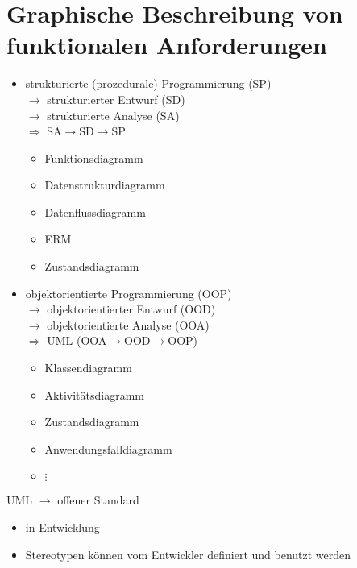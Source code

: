 \documentclass{scrreprt}
\begin{document}
\section{Graphische Beschreibung von funktionalen Anforderungen}
\begin{itemize}
\item strukturierte (prozedurale) Programmierung (SP)\\
$\to$ strukturierter Entwurf (SD)\\
$\to$ strukturierte Analyse (SA)\\
$\Rightarrow$ SA$\to$SD$\to$SP
\begin{itemize}
\item Funktionsdiagramm
\item Datenstrukturdiagramm
\item Datenflussdiagramm
\item ERM
\item Zustandsdiagramm
\end{itemize}
\item objektorientierte Programmierung (OOP)\\
$\to$ objektorientierter Entwurf (OOD)\\
$\to$ objektorientierte Analyse (OOA)\\
$\Rightarrow$ UML (OOA$\to$OOD$\to$OOP)
\begin{itemize}
\item Klassendiagramm
\item Aktivitätsdiagramm
\item Zustandsdiagramm
\item Anwendungsfalldiagramm
\item[] $\vdots$
\end{itemize}
\end{itemize}
UML $\to$ offener Standard
\begin{itemize}[label=$\to$]
\item in Entwicklung
\item Stereotypen können vom Entwickler definiert und benutzt werden
\end{itemize}
\end{document}
